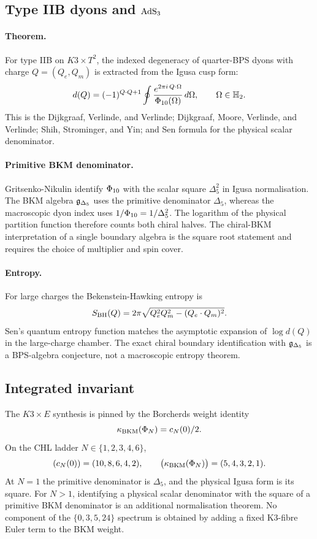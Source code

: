 \subsection*{Type IIB dyons and \(\mathrm{AdS}_3\)}

\paragraph{Theorem.}
For type IIB on \(K3\times T^2\), the indexed degeneracy of
quarter-BPS dyons with charge \(Q=(Q_e,Q_m)\) is extracted from the
Igusa cusp form:
\[
  d(Q)=(-1)^{Q\cdot Q+1}
  \oint
  \frac{e^{2\pi i\, Q\cdot\Omega}}{\Phi_{10}(\Omega)}\,d\Omega,
  \qquad
  \Omega\in\mathbb{H}_2.
\]
This is the Dijkgraaf, Verlinde, and Verlinde; Dijkgraaf, Moore,
Verlinde, and Verlinde; Shih, Strominger, and Yin; and Sen formula for
the physical scalar denominator.

\paragraph{Primitive BKM denominator.}
Gritsenko-Nikulin identify \(\Phi_{10}\) with the scalar square
\(\Delta_5^2\) in Igusa normalisation.  The BKM algebra \(\mathfrak{g}_{\Delta_5}\) uses
the primitive denominator \(\Delta_5\), whereas the macroscopic dyon
index uses \(1/\Phi_{10}=1/\Delta_5^2\).  The logarithm of the physical
partition function therefore counts both chiral halves.  The
chiral-BKM interpretation of a single boundary algebra is the square
root statement and requires the choice of multiplier and spin cover.

\paragraph{Entropy.}
For large charges the Bekenstein-Hawking entropy is
\[
  S_{\mathrm{BH}}(Q)=2\pi
  \sqrt{Q_e^2Q_m^2-(Q_e\cdot Q_m)^2}.
\]
Sen's quantum entropy function matches the asymptotic expansion of
\(\log d(Q)\) in the large-charge chamber.  The exact chiral boundary
identification with \(\mathfrak{g}_{\Delta_5}\) is a BPS-algebra conjecture, not a
macroscopic entropy theorem.

\subsection*{Integrated invariant}

The \(K3\times E\) synthesis is pinned by the Borcherds weight identity
\[
  \kappa_{\mathrm{BKM}}(\Phi_N)=c_N(0)/2.
\]
On the CHL ladder \(N\in\{1,2,3,4,6\}\),
\[
  (c_N(0))=(10,8,6,4,2),\qquad
  \bigl(\kappa_{\mathrm{BKM}}(\Phi_N)\bigr)=(5,4,3,2,1).
\]
At \(N=1\) the primitive denominator is \(\Delta_5\), and the physical
Igusa form is its square.  For \(N>1\), identifying a physical scalar
denominator with the square of a primitive BKM denominator is an
additional normalisation theorem.  No component of the
\(\{0,3,5,24\}\) spectrum is obtained by adding a fixed K3-fibre Euler
term to the BKM weight.

